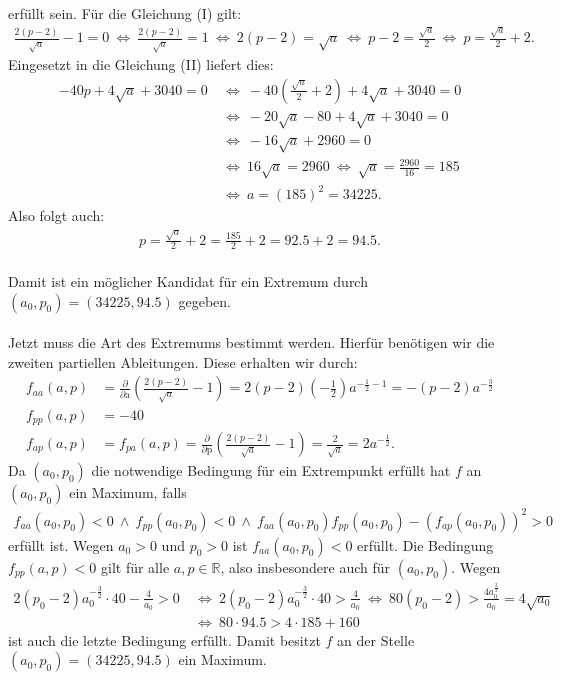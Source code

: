 erfüllt sein. Für die Gleichung (I) gilt:
\begin{align*}
\frac{2(p-2)}{\sqrt{a}} - 1 = 0 
\ \Leftrightarrow \
 \frac{2(p-2)}{\sqrt{a}} = 1 
\ \Leftrightarrow \
2(p-2) = \sqrt{a} 
\ \Leftrightarrow \
p-2 = \frac{\sqrt{a}}{2}
\ \Leftrightarrow \
p =  \frac{\sqrt{a}}{2} + 2.
\end{align*}
Eingesetzt in die Gleichung (II) liefert dies:
\begin{align*}
-40 p + 4 \sqrt{a} +3040 = 0 
\ &\Leftrightarrow \
- 40 \left( \frac{\sqrt{a}}{2} + 2 \right) + 4 \sqrt{a} +3040 = 0\\
\ &\Leftrightarrow \
-20 \sqrt{a} - 80 + 4 \sqrt{a} + 3040 = 0\\
\ &\Leftrightarrow \
- 16 \sqrt{a} + 2960 = 0\\
\ &\Leftrightarrow \
16 \sqrt{a } = 2960
\ \Leftrightarrow \
\sqrt{a} = \frac{2960}{16 } = 185\\
\ &\Leftrightarrow \
a = (185)^2 = 34225.
\end{align*}
Also folgt auch:
\begin{align*}
p = \frac{\sqrt{a}}{2} + 2 = \frac{185}{2} +2  = 92.5 +2  =94.5.
\end{align*}
\ \\
Damit ist ein möglicher Kandidat für ein Extremum durch $ (a_0,p_0) = (34225,94.5) $ gegeben.\\
\\
Jetzt muss die Art des Extremums bestimmt werden. Hierfür benötigen wir die zweiten partiellen Ableitungen. Diese erhalten wir durch:
\begin{align*}
f_{aa}(a,p) &= 
\frac{\partial}{\partial \textrm{a}}
\left( \frac{2(p-2)}{\sqrt{a}} - 1 \right)
=
2 (p-2) \left(-\frac{1}{2} \right) a^{- \frac{1}{2} - 1 }
= - (p-2) a^{-\frac{3}{2}}\\
f_{pp}(a,p) &= -40\\
f_{ap}(a,p) &= f_{pa}(a,p) = 
\frac{\partial}{\partial \textrm{p}}
\left( \frac{2(p-2)}{\sqrt{a}} - 1\right)
 = \frac{2}{\sqrt{a}} =  2 a^{- \frac{1}{2}}.
\end{align*}
Da $ (a_0,p_0)  $ die notwendige Bedingung für ein Extrempunkt erfüllt hat $ f $ an $ (a_0,p_0) $ ein Maximum, falls
\begin{align*}
f_{aa}(a_0,p_0) < 0  \ \wedge \ f_{pp}(a_0,p_0)< 0 \ \wedge \
f_{aa}(a_0,p_0) f_{pp}(a_0,p_0) - (f_{ap}(a_0,p_0))^2 > 0
\end{align*}
erfüllt ist. Wegen $ a_0 > 0  $ und $ p_0 > 0 $ ist $ f_{aa}(a_0,p_0) < 0 $ erfüllt.
Die Bedingung $ f_{pp}(a,p) < 0  $ gilt für alle $ a,p \in \mathbb{R} $, also insbesondere auch für $ (a_0,p_0) $.
Wegen
\begin{align*}
2(p_0-2)a_0^{-\frac{3}{2} } \cdot 40 - \frac{4}{a_0} > 0
\ &\Leftrightarrow \
2(p_0-2)a_0^{-\frac{3}{2} } \cdot 40 >  \frac{4}{a_0}
\ \Leftrightarrow \
80(p_0 -2) > \frac{4 a_0^{\frac{3}{2}} }{a_0} = 4 \sqrt{a_0}\\
\ &\Leftrightarrow \
 80 \cdot 94.5 > 4 \cdot 185 + 160
\end{align*}
ist auch die letzte Bedingung erfüllt.
Damit besitzt $ f $ an der Stelle $ (a_0,p_0) = (34225,94.5) $ ein Maximum.

